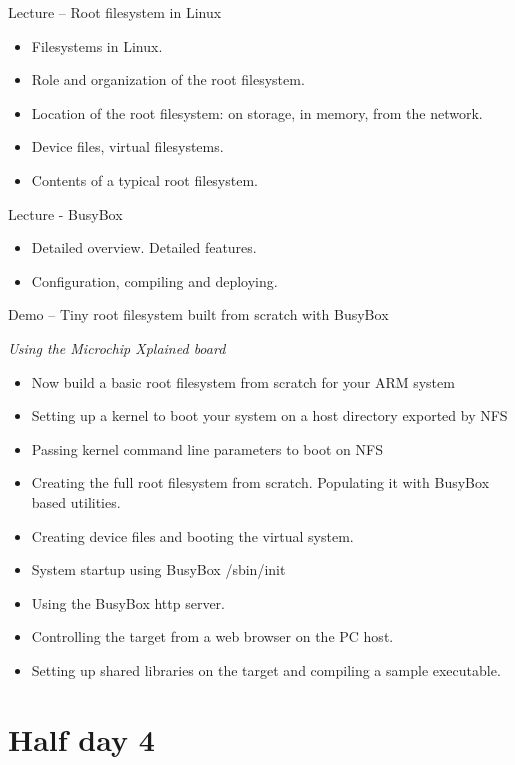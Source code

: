 \documentclass[a4paper,12pt,obeyspaces,spaces,hyphens]{article}
\begin{document}
\feagendatwocolumn
{Lecture – Root filesystem in Linux}
{
  \begin{itemize}
  \item Filesystems in Linux.
  \item Role and organization of the root filesystem.
  \item Location of the root filesystem: on storage, in memory,
        from the network.
  \item Device files, virtual filesystems.
  \item Contents of a typical root filesystem.
  \end{itemize}
}
{Lecture - BusyBox}
{
  \begin{itemize}
  \item Detailed overview. Detailed features.
  \item Configuration, compiling and deploying.
  \end{itemize}
}

\feagendaonecolumn
{Demo – Tiny root filesystem built from scratch with BusyBox}
{
  {\em Using the Microchip Xplained board}
  \begin{itemize}
  \item Now build a basic root filesystem from scratch for your ARM system
  \item Setting up a kernel to boot your system on a host
        directory exported by NFS
  \item Passing kernel command line parameters to boot on NFS
  \item Creating the full root filesystem from scratch.
        Populating it with BusyBox based utilities.
  \item Creating device files and booting the virtual system.
  \item System startup using BusyBox /sbin/init
  \item Using the BusyBox http server.
  \item Controlling the target from a web browser on the PC host.
  \item Setting up shared libraries on the target and compiling
        a sample executable.
  \end{itemize}
}

\section{Half day 4}
\end{document}
